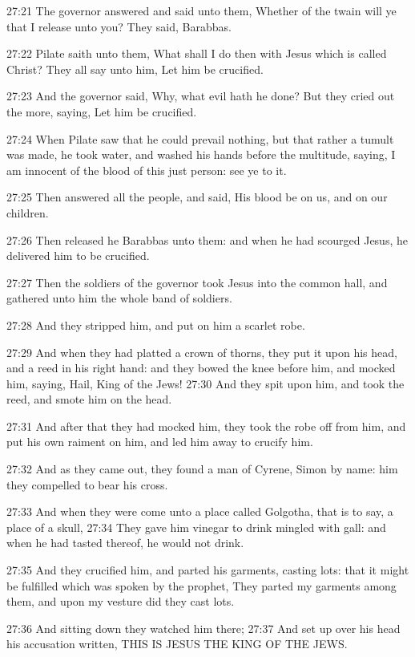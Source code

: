 27:21 The governor answered and said unto them, Whether of the twain will ye that I release unto you? They said, Barabbas.

27:22 Pilate saith unto them, What shall I do then with Jesus which is called Christ? They all say unto him, Let him be crucified.

27:23 And the governor said, Why, what evil hath he done? But they cried out the more, saying, Let him be crucified.

27:24 When Pilate saw that he could prevail nothing, but that rather a tumult was made, he took water, and washed his hands before the multitude, saying, I am innocent of the blood of this just person: see ye to it.

27:25 Then answered all the people, and said, His blood be on us, and on our children.

27:26 Then released he Barabbas unto them: and when he had scourged Jesus, he delivered him to be crucified.

27:27 Then the soldiers of the governor took Jesus into the common hall, and gathered unto him the whole band of soldiers.

27:28 And they stripped him, and put on him a scarlet robe.

27:29 And when they had platted a crown of thorns, they put it upon his head, and a reed in his right hand: and they bowed the knee before him, and mocked him, saying, Hail, King of the Jews!  27:30 And they spit upon him, and took the reed, and smote him on the head.

27:31 And after that they had mocked him, they took the robe off from him, and put his own raiment on him, and led him away to crucify him.

27:32 And as they came out, they found a man of Cyrene, Simon by name: him they compelled to bear his cross.

27:33 And when they were come unto a place called Golgotha, that is to say, a place of a skull, 27:34 They gave him vinegar to drink mingled with gall: and when he had tasted thereof, he would not drink.

27:35 And they crucified him, and parted his garments, casting lots: that it might be fulfilled which was spoken by the prophet, They parted my garments among them, and upon my vesture did they cast lots.

27:36 And sitting down they watched him there; 27:37 And set up over his head his accusation written, THIS IS JESUS THE KING OF THE JEWS.

